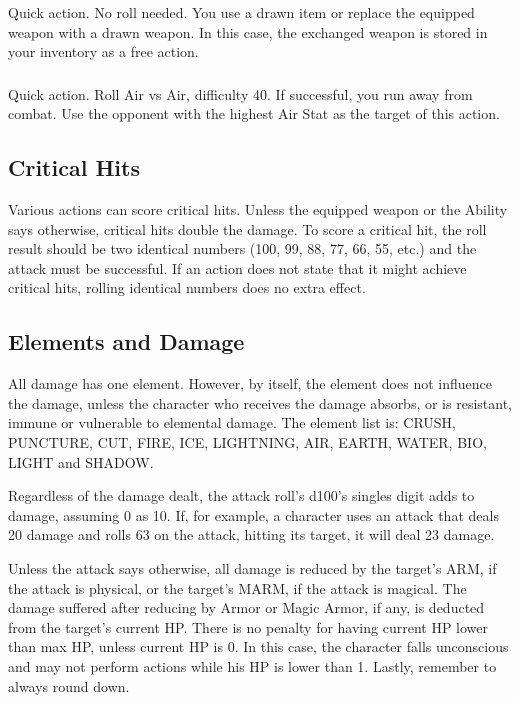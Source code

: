 \begin{multicols}{2}
\subsubsection{}
Quick action. No roll needed. You use a drawn item or replace the equipped weapon with a drawn weapon. In this case, the exchanged weapon is stored in your inventory as a free action.

\subsubsection{}
Quick action. Roll Air vs Air, difficulty 40. If successful, you run away from combat. Use the opponent with the highest Air Stat as the target of this action.

\subsection{Critical Hits}
Various actions can score critical hits. Unless the equipped weapon or the Ability says otherwise, critical hits double the damage. To score a critical hit, the roll result should be two identical numbers (100, 99, 88, 77, 66, 55, etc.) and the attack must be successful. If an action does not state that it might achieve critical hits, rolling identical numbers does no extra effect.

\begin{center}
\end{center}

\subsection{Elements and Damage}
All damage has one element. However, by itself, the element does not influence the damage, unless the character who receives the damage absorbs, or is resistant, immune or vulnerable to elemental damage. The element list is: CRUSH, PUNCTURE, CUT, FIRE, ICE, LIGHTNING, AIR, EARTH, WATER, BIO, LIGHT and SHADOW\@. %

Regardless of the damage dealt, the attack roll’s d100’s singles digit adds to damage, assuming 0 as 10. If, for example, a character uses an attack that deals 20 damage and rolls 63 on the attack, hitting its target, it will deal 23 damage.

Unless the attack says otherwise, all damage is reduced by the target's ARM, if the attack is physical, or the target’s MARM, if the attack is magical. The damage suffered after reducing by Armor or Magic Armor, if any, is deducted from the target’s current HP\@. There is no penalty for having current HP lower than max HP, unless current HP is 0. In this case, the character falls unconscious and may not perform actions while his HP is lower than 1. Lastly, remember to always round down.


\end{multicols}
